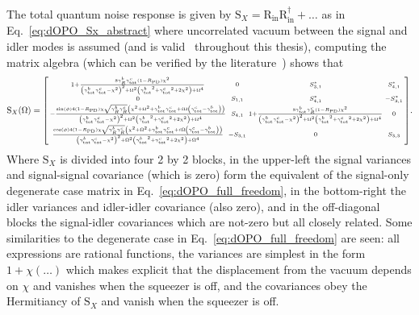 The total quantum noise response is given by $\text{S}_X=\text{R}_\text{in} \text{R}_\text{in}^\dag + \ldots$ as in Eq.~\ref{eq:dOPO_Sx_abstract} where uncorrelated vacuum between the signal and idler modes is assumed (and is valid~\cite{} throughout this thesis), computing the matrix algebra (which can be verified by the literature~\cite{}) shows that 
$$\label{eq:nOPO_full_freedom}
\text{S}_X(\Omega)=\begin{bsmallmatrix}
1+\frac{8 \gamma^b_R {\gamma^c_\text{tot}} (1-R_\text{PD}) \chi ^2}{\left({\gamma^b_\text{tot}} {\gamma^c_\text{tot}}-\chi ^2\right)^2+\Omega ^2 \left({\gamma^b_\text{tot}}^2+{\gamma^c_\text{tot}}^2+2 \chi ^2\right)+\Omega ^4} & 0 & S_{3,1}^* & S_{4,1}^* \\
0 & S_{1,1} & S_{4,1}^* & -S_{3,1}^* \\
-\frac{\sin (\phi )4 (1-R_\text{PD}) \chi  \sqrt{\gamma^b_R \gamma^c_R}  \left(\chi ^2+\Omega^2+\gamma^b_\text{tot}\gamma^c_\text{tot}+i\Omega\left(\gamma^c_\text{tot}-\gamma^b_\text{tot}\right)\right)}{\left({\gamma^b_\text{tot}} {\gamma^c_\text{tot}}-\chi ^2\right)^2+\Omega ^2 \left({\gamma^b_\text{tot}}^2+{\gamma^c_\text{tot}}^2+2 \chi ^2\right)+\Omega ^4} & S_{4,1} & 1+\frac{8 {\gamma^b_\text{tot}} \gamma^c_R (1-R_\text{PD}) \chi ^2}{\left({\gamma^b_\text{tot}} {\gamma^c_\text{tot}}-\chi ^2\right)^2+\Omega ^2 \left({\gamma^b_\text{tot}}^2+{\gamma^c_\text{tot}}^2+2 \chi ^2\right)+\Omega ^4} & 0\\
\frac{\cos (\phi ) 4 (1-R_\text{PD}) \chi  \sqrt{\gamma^b_R \gamma^c_R} \left(\chi ^2+\Omega^2+\gamma^b_\text{tot}\gamma^c_\text{tot}+i\Omega\left(\gamma^c_\text{tot}-\gamma^b_\text{tot}\right)\right)}{\left({\gamma^b_\text{tot}} {\gamma^c_\text{tot}}-\chi ^2\right)^2+\Omega ^2 \left({\gamma^b_\text{tot}}^2+{\gamma^c_\text{tot}}^2+2 \chi ^2\right)+\Omega ^4} & -S_{3,1} & 0 & S_{3,3}
\end{bsmallmatrix}.$$
Where $\text{S}_X$ is divided into four 2 by 2 blocks, in the upper-left the signal variances and signal-signal covariance (which is zero) form the equivalent of the signal-only degenerate case matrix in Eq.~\ref{eq:dOPO_full_freedom}, in the bottom-right the idler variances and idler-idler covariance (also zero), and in the off-diagonal blocks the signal-idler covariances which are not-zero but all closely related. Some similarities to the degenerate case in Eq.~\ref{eq:dOPO_full_freedom} are seen: all expressions are rational functions, the variances are simplest in the form $1+\chi (\ldots)$ which makes explicit that the displacement from the vacuum depends on $\chi$ and vanishes when the squeezer is off, and the covariances obey the Hermitiancy of $\text{S}_X$ and vanish when the squeezer is off. 

